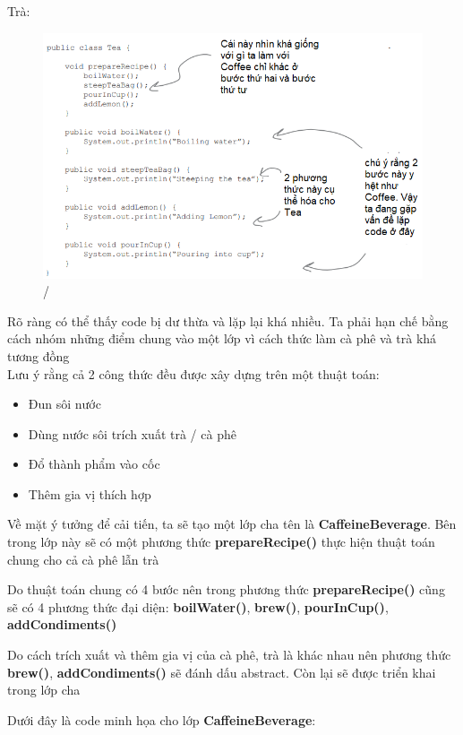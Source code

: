 Trà:
\begin{figure}[!htb]
    \centering
    \includegraphics[width=\textwidth]{fig/Template/Tea.png}/
\end{figure}

Rõ ràng có thể thấy code bị dư thừa và lặp lại khá nhiều. Ta phải hạn chế bằng cách nhóm những điểm chung vào một lớp vì cách thức làm cà phê và trà khá tương đồng\\[0.1in]

Lưu ý rằng cả 2 công thức đều được xây dựng trên một thuật toán:
\begin{itemize}
\item Đun sôi nước
\item Dùng nước sôi trích xuất trà / cà phê
\item Đổ thành phẩm vào cốc
\item Thêm gia vị thích hợp
\end{itemize}

Về mặt ý tưởng để cải tiến, ta sẽ tạo một lớp cha tên là \textbf{CaffeineBeverage}. Bên trong lớp này sẽ có một phương thức \textbf{prepareRecipe()} thực hiện thuật toán chung cho cả cà phê lẫn trà\smallskip

Do thuật toán chung có 4 bước nên trong phương thức \textbf{prepareRecipe()} cũng sẽ có 4 phương thức đại diện: \textbf{boilWater()}, \textbf{brew()}, \textbf{pourInCup()}, \textbf{addCondiments()}\smallskip

Do cách trích xuất và thêm gia vị của cà phê, trà là khác nhau nên phương thức \textbf{brew()}, \textbf{addCondiments()} sẽ đánh dấu abstract. Còn lại sẽ được triển khai trong lớp cha
\newpage

Dưới đây là code minh họa cho lớp \textbf{CaffeineBeverage}:

